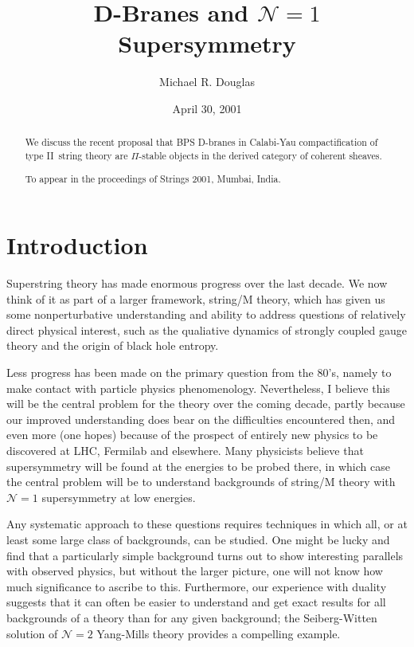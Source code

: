\documentclass[a4paper,12pt]{amsart}
\numberwithin{equation}{section}
\theoremstyle{plain}
\theoremstyle{definition}
\def\cal{\mathcal}
\def \II {II}
\def\CN{{\cal N}}
\begin{document}
\title{D-Branes and $\CN=1$ Supersymmetry}

\author[M.R. Douglas]{Michael R. Douglas}
\address[Michael R. Douglas]{
Dept. of Physics and Astronomy, Rutgers University,
Piscataway, NJ 08855 USA {\it and}
I.H.E.S., Le Bois-Marie, Bures-sur-Yvette 91440 France}
\begin{abstract}
We discuss the recent proposal that BPS D-branes in Calabi-Yau
compactification of type \II\ string theory are $\Pi$-stable
objects in the derived category of coherent sheaves.

To appear in the proceedings of Strings 2001, Mumbai, India.
\end{abstract}

\date{April 30, 2001}
\maketitle
\section{Introduction}\label{S:intro}
Superstring theory has made enormous progress over the last decade.
We now think of it as part of a larger framework, string/M theory,
which has given us some nonperturbative understanding and ability to
address questions of relatively direct physical interest, such as the
qualiative dynamics of strongly coupled gauge theory and the origin
of black hole entropy.

Less progress has been made on the primary question from the 80's,
namely to make contact with particle physics phenomenology.
Nevertheless, I believe this will be the central problem for the
theory over the coming decade, partly because our improved
understanding does bear on the difficulties encountered then, and even
more (one hopes) because of the prospect of entirely new physics to be
discovered at LHC, Fermilab and elsewhere.  Many physicists believe that
supersymmetry will be found at the energies to be probed there, in which
case the central problem will be to understand backgrounds of
string/M theory with $\CN=1$ supersymmetry at low energies.

Any systematic approach to these questions requires techniques in
which all, or at least some large class of backgrounds, can be
studied.  One might be lucky and find that a particularly simple
background turns out to show interesting parallels with observed
physics, but without the larger picture, one will not know how much
significance to ascribe to this.  Furthermore, our experience with
duality suggests that it can often be easier to understand and get
exact results for all backgrounds of a theory than for any given
background; the Seiberg-Witten solution of $\CN=2$ Yang-Mills theory
provides a compelling example.
\end{document}
